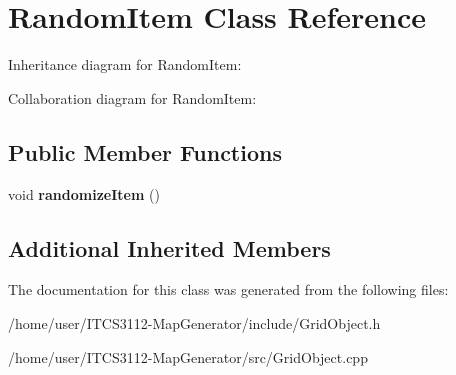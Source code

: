 \hypertarget{classRandomItem}{}\section{Random\+Item Class Reference}
\label{classRandomItem}


Inheritance diagram for Random\+Item\+:


Collaboration diagram for Random\+Item\+:
\subsection*{Public Member Functions}
\begin{DoxyCompactItemize}
\item 
\mbox{\label{classRandomItem_a52d24c207d694527a51486ef472db3f4}} 
void {\bfseries randomize\+Item} ()
\end{DoxyCompactItemize}
\subsection*{Additional Inherited Members}


The documentation for this class was generated from the following files\+:\begin{DoxyCompactItemize}
\item 
/home/user/\+I\+T\+C\+S3112-\/\+Map\+Generator/include/Grid\+Object.\+h\item 
/home/user/\+I\+T\+C\+S3112-\/\+Map\+Generator/src/Grid\+Object.\+cpp\end{DoxyCompactItemize}
